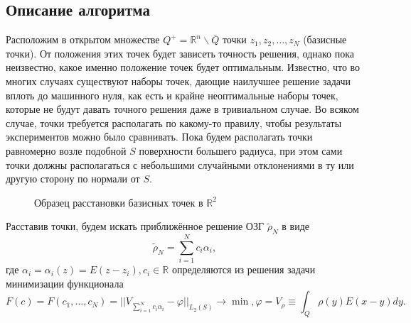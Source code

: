 \documentclass[a4paper, 12pt]{article}
\newcommand{\V}[1]{\int_Q #1(y) E(x-y) dy}
\newcommand{\R}[1]{\mathbb{R}^#1}
\begin{document}
\subsection{Описание алгоритма}
Расположим в открытом множестве $Q^+= \R{n}\backslash \bar Q$ точки $z_1,z_2,\dots,z_N$ (базисные точки). От положения этих точек будет зависеть точность решения, однако пока неизвестно, какое именно положение точек будет оптимальным.
Известно, что во многих случаях существуют наборы точек, дающие наилучшее решение задачи вплоть до машинного нуля, как есть и крайне неоптимальные наборы точек, которые не будут давать точного решения даже в тривиальном случае.
Во всяком случае, точки требуется располагать по какому-то правилу, чтобы результаты экспериментов можно было сравнивать.
Пока будем располагать точки равномерно возле подобной $S$ поверхности большего радиуса, при этом сами точки должны располагаться с небольшими случайными отклонениями в ту или другую сторону по нормали от $S$.

\begin{figure}[!h]
    \noindent{}
    \caption{Образец расстановки базисных точек в $\R{2}$}
\end{figure}


Расставив точки, будем искать приближённое решение ОЗГ $\tilde \rho_N$ в виде
\begin{equation}
    \tilde \rho_N=\sum_{i=1}^N c_i \alpha_i,
\end{equation}
где $\alpha_i=\alpha_i(z)=E(z-z_i),c_i \in \mathbb{R}$ определяются из решения задачи минимизации функционала
\begin{equation}
    F(c)=F(c_1,\dots,c_N)=\Bigr|\Bigr|V_{\sum_{i=1}^N c_i \alpha_i} -\varphi\Bigr|\Bigr|_{L_2(S)} \rightarrow \min, \varphi =V_{\rho} \equiv \V{\rho}. 
\end{equation}
\end{document}
